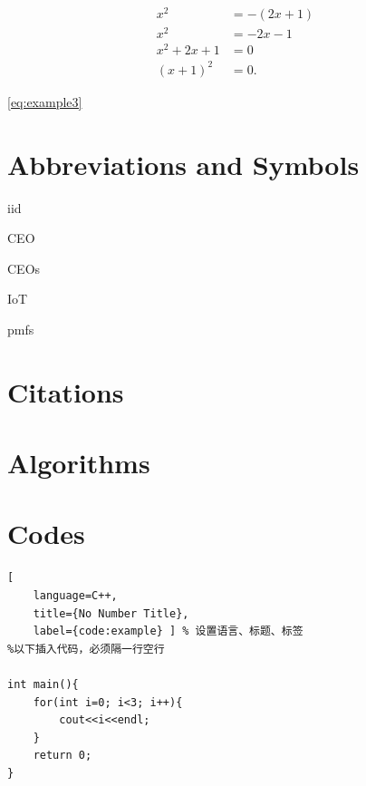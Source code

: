 \begin{align}
x^2 &= -(2x +1) \\
x^2 &= -2x -1 \nonumber\\
x^2+2x +1 &= 0 \label{eq:example2}\\
(x+1)^2 &=0 \label{eq:example3}.
\end{align}

\eqref{eq:example3}


\section{Abbreviations and Symbols}
\gls{iid}


\Gls{CEO}


\glspl{CEO}

\gls{IoT}


\Glspl{pmf}

\section{Citations}
\cite{berger1978multiterminal}

\cite{berrou1996near,shannon1959coding,el2011network,mp3standard}

\cite{el2011network,berger1978multiterminal}

\cite{Tung1978multiterminal}

\section{Algorithms}
\begin{algorithm}
\caption{An Example}
\label{alg:example}
\begin{algorithmic}

	\ENDFOR
\ELSE
	\ENDFOR 
\ENDIF
\end{algorithmic}
\end{algorithm}


\section{Codes}
\begin{lstlisting}[
	language=C++,
	title={No Number Title},
	label={code:example} ] % 设置语言、标题、标签
%以下插入代码，必须隔一行空行

int main(){
	for(int i=0; i<3; i++){
		cout<<i<<endl;
	}
	return 0;
}
\end{lstlisting}

